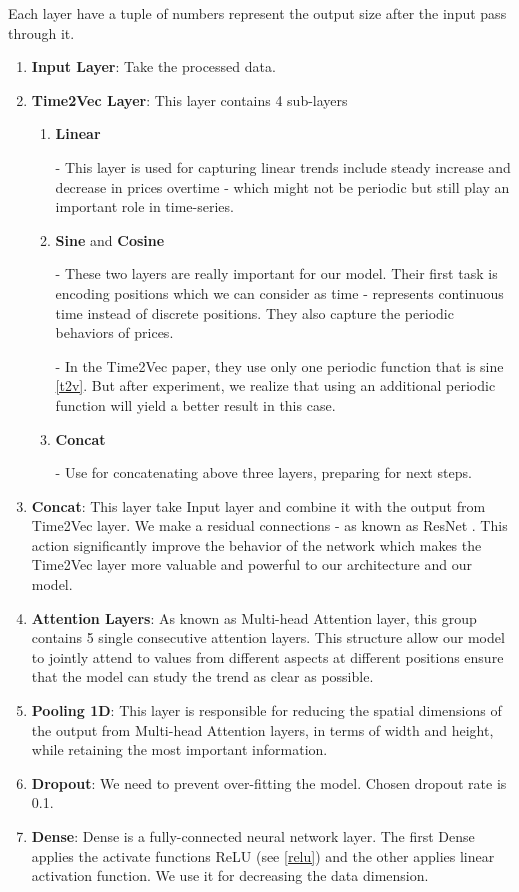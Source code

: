 Each layer have a tuple of numbers represent the output size after the input
pass through it.
\begin{enumerate}
	\item \textbf{Input Layer}: Take the processed data.
	
	\item \textbf{Time2Vec Layer}: This layer contains 4 sub-layers
	\begin{enumerate}
		\item \textbf{Linear}
		
		- This layer is used for capturing linear trends include steady increase
		and decrease in prices overtime - which might not be periodic but still play
		an important role in time-series.
		
		\item \textbf{Sine} and \textbf{Cosine}
		
		- These two layers are really important for our model. Their first task is
		encoding positions which we can consider as time - represents continuous
		time instead of discrete positions. They also capture the periodic
		behaviors of prices.
		
		- In the Time2Vec paper, they use only one periodic function that is sine
		\autoref{t2v}. But after experiment, we realize that using an additional
		periodic function will yield a better result in this case.
		
		\item \textbf{Concat}
		
		- Use for concatenating above three layers, preparing for next steps.
	\end{enumerate}
	
	\item \textbf{Concat}: This layer take Input layer and combine it with the output
	from Time2Vec layer. We make a residual connections - as known as ResNet
	\cite{resnet}. This action significantly improve the behavior of the network
	which makes the Time2Vec layer more valuable and powerful to our architecture
	and our model.
	
	\item \textbf{Attention Layers}: As known as Multi-head Attention layer, this
	group contains 5 single consecutive attention layers. This structure allow our
	model to jointly attend to values from different aspects at different positions
	ensure that the model can study the trend as clear as possible.
	
	\item \textbf{Pooling 1D}: This layer is responsible for reducing the spatial dimensions
	of the output from Multi-head Attention layers, in terms of width and height,
	while retaining the most important information.
	
	\item \textbf{Dropout}: We need to prevent over-fitting the model. Chosen
	dropout rate is 0.1.
	
	\item \textbf{Dense}: Dense is a fully-connected neural network layer. The first
	Dense applies the activate functions ReLU (see \autoref{relu}) and the other applies
	linear activation function. We use it for decreasing the data dimension.
\end{enumerate}

